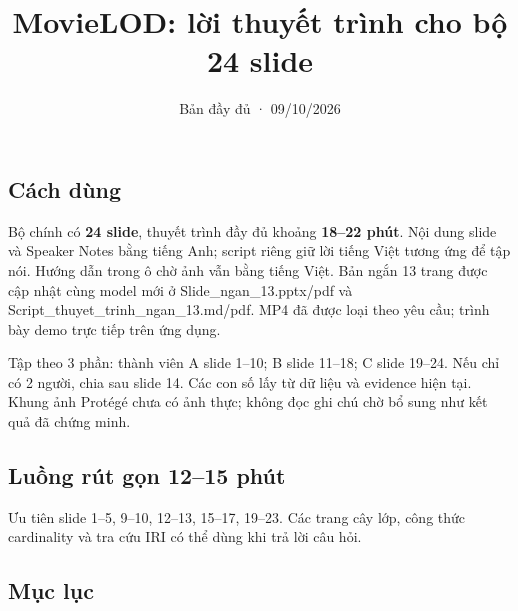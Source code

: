 \documentclass[
  11pt,
]{article}
\title{MovieLOD: lời thuyết trình cho bộ 24 slide}
\author{}
\date{Bản đầy đủ · 09/10/2026}
\begin{document}
\maketitle

\subsection{Cách dùng}\label{cuxe1ch-duxf9ng}

Bộ chính có \textbf{24 slide}, thuyết trình đầy đủ khoảng \textbf{18--22
phút}. Nội dung slide và Speaker Notes bằng tiếng Anh; script riêng giữ
lời tiếng Việt tương ứng để tập nói. Hướng dẫn trong ô chờ ảnh vẫn bằng
tiếng Việt. Bản ngắn 13 trang được cập nhật cùng model mới ở
Slide\_\allowbreak{}ng\allowbreak{}an\_\allowbreak{}13.\allowbreak{}pp\allowbreak{}tx/\allowbreak{}pdf
và
Script\_\allowbreak{}t\allowbreak{}huyet\_\allowbreak{}tr\allowbreak{}inh\_\allowbreak{}ngan\allowbreak{}\_\allowbreak{}13.\allowbreak{}md/\allowbreak{}p\allowbreak{}df.\allowbreak{}
MP4 đã được loại theo yêu cầu; trình bày demo trực tiếp trên ứng dụng.

Tập theo 3 phần: thành viên A slide 1--10; B slide 11--18; C slide
19--24. Nếu chỉ có 2 người, chia sau slide 14. Các con số lấy từ dữ liệu
và evidence hiện tại. Khung ảnh Protégé chưa có ảnh thực; không đọc ghi
chú chờ bổ sung như kết quả đã chứng minh.

\subsection{Luồng rút gọn 12--15
phút}\label{luux1ed3ng-ruxfat-gux1ecdn-1215-phuxfat}

Ưu tiên slide 1--5, 9--10, 12--13, 15--17, 19--23. Các trang cây lớp,
công thức cardinality và tra cứu IRI có thể dùng khi trả lời câu hỏi.

\subsection{Mục lục}\label{mux1ee5c-lux1ee5c}
\end{document}
